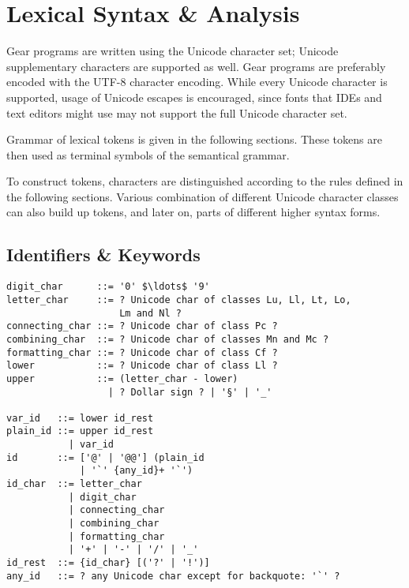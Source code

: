 
\newcommand{\Unicode}[1]{\mbox{$\backslash$u{#1}}}
\newcommand{\UnicodeRange}[2]{\mbox{$\backslash$u{#1}-$\backslash$u{#2}}}

\chapter{Lexical Syntax \& Analysis}
\label{sec:lexical-analysis}

\minitoc

Gear programs are written using the Unicode character set; Unicode supplementary characters are supported as well. Gear programs are preferably encoded with the UTF-8 character encoding. While every Unicode character is supported, usage of Unicode escapes is encouraged, since fonts that IDEs and text editors might use may not support the full Unicode character set.

Grammar of lexical tokens is given in the following sections. These tokens are then used as terminal symbols of the semantical grammar. 

To construct tokens, characters are distinguished according to the rules defined in the following sections. Various combination of different Unicode character classes can also build up tokens, and later on, parts of different higher syntax forms. 


\newpage






\section{Identifiers \& Keywords}
\label{sec:identifiers}
\label{sec:keywords}

\syntax\begin{lstlisting}[deletekeywords={of,and,class,for}]
digit_char      ::= '0' $\ldots$ '9'
letter_char     ::= ? Unicode char of classes Lu, Ll, Lt, Lo, 
                    Lm and Nl ?
connecting_char ::= ? Unicode char of class Pc ?
combining_char  ::= ? Unicode char of classes Mn and Mc ?
formatting_char ::= ? Unicode char of class Cf ?
lower           ::= ? Unicode char of class Ll ?
upper           ::= (letter_char - lower) 
                  | ? Dollar sign ? | '§' | '_'

var_id   ::= lower id_rest
plain_id ::= upper id_rest
           | var_id
id       ::= ['@' | '@@'] (plain_id
             | '`' {any_id}+ '`')
id_char  ::= letter_char
           | digit_char
           | connecting_char
           | combining_char
           | formatting_char
           | '+' | '-' | '/' | '_'
id_rest  ::= {id_char} [('?' | '!')]
any_id   ::= ? any Unicode char except for backquote: '`' ?
\end{lstlisting}

